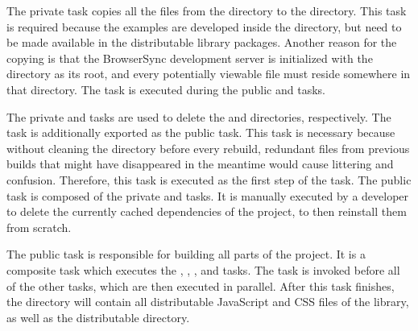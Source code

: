 The private  task copies all the files from the
 directory to the  directory. This
task is required because the examples are developed inside the
 directory, but need to be made available in the
distributable library packages. Another reason for the copying is that
the BrowserSync development server is initialized with the
 directory as its root, and every potentially viewable
file must reside somewhere in that directory. The 
task is executed during the public  and 
tasks.

The private  and  tasks are
used to delete the  and  directories,
respectively. The  task is additionally exported as
the public  task. This task is necessary because without
cleaning the  directory before every rebuild, redundant
files from previous builds that might have disappeared in the meantime
would cause littering and confusion. Therefore, this task is executed
as the first step of the  task. The public 
task is composed of the private  and
 tasks. It is manually executed by a developer
to delete the currently cached dependencies of the project, to then
reinstall them from scratch.

The public  task is responsible for building all parts of
the project. It is a composite task which executes the ,
, , and  tasks. The
 task is invoked before all of the other tasks, which are
then executed in parallel. After this task finishes, the 
directory will contain all distributable JavaScript and CSS files of
the library, as well as the distributable  directory.

